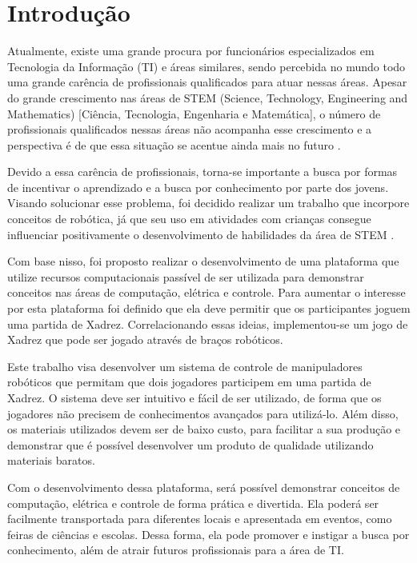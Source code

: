 \chapter[Introdução]{Introdução}
\label{cap:introducao}

Atualmente, existe uma grande procura por funcionários especializados em Tecnologia da Informação (TI) e áreas similares, sendo percebida no mundo todo uma grande carência de profissionais qualificados para atuar nessas áreas.
Apesar do grande crescimento nas áreas de STEM (Science, Technology, Engineering and Mathematics) [Ciência, Tecnologia, Engenharia e Matemática], o número de profissionais qualificados nessas áreas não acompanha esse crescimento e a perspectiva é de que essa situação se acentue ainda mais no futuro \cite{shortage_of_workers}.

Devido a essa carência de profissionais, torna-se importante a busca por formas de incentivar o aprendizado e a busca por conhecimento por parte dos jovens.
Visando solucionar esse problema, foi decidido realizar um trabalho que incorpore conceitos de robótica, já que seu uso em atividades com crianças consegue influenciar positivamente o desenvolvimento de habilidades da área de STEM \cite{technology_for_stem}.

Com base nisso, foi proposto realizar o desenvolvimento de uma plataforma que utilize recursos computacionais passível de ser utilizada para demonstrar conceitos nas áreas de computação, elétrica e controle.
Para aumentar o interesse por esta plataforma foi definido que ela deve permitir que os participantes joguem uma partida de Xadrez.
Correlacionando essas ideias, implementou-se um jogo de Xadrez que pode ser jogado através de braços robóticos.

Este trabalho visa desenvolver um sistema de controle de manipuladores robóticos que permitam que dois jogadores participem em uma partida de Xadrez.
O sistema deve ser intuitivo e fácil de ser utilizado, de forma que os jogadores não precisem de conhecimentos avançados para utilizá-lo.
Além disso, os materiais utilizados devem ser de baixo custo, para facilitar a sua produção e demonstrar que é possível desenvolver um produto de qualidade utilizando materiais baratos.

Com o desenvolvimento dessa plataforma, será possível demonstrar conceitos de computação, elétrica e controle de forma prática e divertida.
Ela poderá ser facilmente transportada para diferentes locais e apresentada em eventos, como feiras de ciências e escolas.
Dessa forma, ela pode promover e instigar a busca por conhecimento, além de atrair futuros profissionais para a área de TI.
